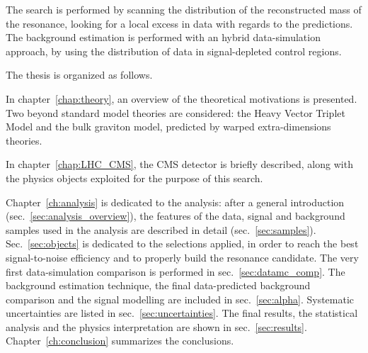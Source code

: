 \noindent The search is performed by scanning the distribution of the reconstructed mass of the resonance, looking for a local excess in data with regards to the predictions. The background estimation is performed with an hybrid data-simulation approach, by using the distribution of data in signal-depleted control regions.

\newpage

\noindent The thesis is organized as follows.

\noindent In chapter~\ref{chap:theory}, an overview of the theoretical motivations is presented. Two beyond standard model theories are considered: the Heavy Vector Triplet Model and the bulk graviton model, predicted by warped extra-dimensions theories.

\noindent In chapter~\ref{chap:LHC_CMS}, the CMS detector is briefly described, along with the physics objects exploited for the purpose of this search.

\noindent Chapter~\ref{ch:analysis} is dedicated to the analysis: after a general introduction (sec.~\ref{sec:analysis_overview}), the features of the data, signal and background samples used in the analysis are described in detail (sec.~\ref{sec:samples}). Sec.~\ref{sec:objects} is dedicated to the selections applied, in order to reach the best signal-to-noise efficiency and to properly build the resonance candidate. The very first data-simulation comparison is performed in sec.~\ref{sec:datamc_comp}. The background estimation technique, the final data-predicted background comparison and the signal modelling are included in sec.~\ref{sec:alpha}. Systematic uncertainties are listed in sec.~\ref{sec:uncertainties}. The final results, the statistical analysis and the physics interpretation are shown in sec.~\ref{sec:results}. Chapter~\ref{ch:conclusion} summarizes the conclusions.

\clearpage

